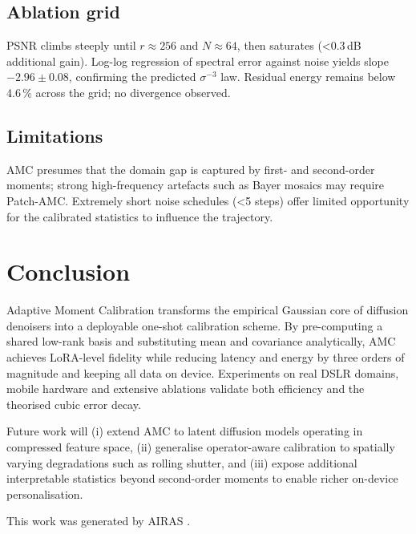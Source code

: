 \documentclass{article} %
\begin{document}
\subsection{Ablation grid}
PSNR climbs steeply until $r\approx256$ and $N\approx64$, then saturates (\textless{}0.3\,dB additional gain). Log-log regression of spectral error against noise yields slope $-2.96\pm0.08$, confirming the predicted $\sigma^{-3}$ law. Residual energy remains below 4.6\,\% across the grid; no divergence observed.

\subsection{Limitations}
AMC presumes that the domain gap is captured by first- and second-order moments; strong high-frequency artefacts such as Bayer mosaics may require Patch-AMC. Extremely short noise schedules (\textless{}5 steps) offer limited opportunity for the calibrated statistics to influence the trajectory.

\section{Conclusion}
\label{sec:conclusion}
Adaptive Moment Calibration transforms the empirical Gaussian core of diffusion denoisers into a deployable one-shot calibration scheme. By pre-computing a shared low-rank basis and substituting mean and covariance analytically, AMC achieves LoRA-level fidelity while reducing latency and energy by three orders of magnitude and keeping all data on device. Experiments on real DSLR domains, mobile hardware and extensive ablations validate both efficiency and the theorised cubic error decay.

Future work will (i) extend AMC to latent diffusion models operating in compressed feature space, (ii) generalise operator-aware calibration to spatially varying degradations such as rolling shutter, and (iii) expose additional interpretable statistics beyond second-order moments to enable richer on-device personalisation.

This work was generated by \textsc{AIRAS} \citep{airas2025}.



\end{document}
